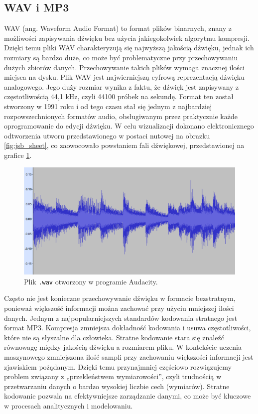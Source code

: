 \documentclass[data-science]{agh-wi} %
\begin{document}
\subsection{WAV i MP3}
WAV (ang. Waveform Audio Format) to format plików binarnych, znany z możliwości zapisywania dźwięku bez użycia jakiegokolwiek algorytmu kompresji. Dzięki temu pliki WAV charakteryzują się najwyższą jakością dźwięku, jednak ich rozmiary są bardzo duże, co może być problematyczne przy przechowywaniu dużych zbiorów danych. Przechowywanie takich plików wymaga znacznej ilości miejsca na dysku. Plik WAV jest najwierniejszą cyfrową reprezentacją dźwięku analogowego. Jego duży rozmiar wynika z faktu, że dźwięk jest zapisywany z częstotliwością 44,1 kHz, czyli 44100 próbek na sekundę. Format ten został stworzony w 1991 roku i od tego czasu stał się jednym z najbardziej rozpowszechnionych formatów audio, obsługiwanym przez praktycznie każde oprogramowanie do edycji dźwięku. W celu wizualizacji dokonano elektronicznego odtworzenia utworu przedstawionego w postaci nutowej na obrazku \ref*{fig:jsb_sheet}, co zaowocowało powstaniem fali dźwiękowej, przedstawionej na grafice \ref*{fig:jsb_wav}.

\begin{figure}
    \begin{center}
        \includegraphics[width=\linewidth]{./img/jsb_wav.png}
    \end{center}
    \caption{Plik \texttt{.wav} otworzony w programie Audacity.}\label{fig:jsb_wav}
\end{figure}

Często nie jest konieczne przechowywanie dźwięku w formacie bezstratnym, ponieważ większość informacji można zachować przy użyciu mniejszej ilości danych. Jednym z najpopularniejszych standardów kodowania stratnego jest format MP3. Kompresja zmniejsza dokładność kodowania i usuwa częstotliwości, które nie są słyszalne dla człowieka. Stratne kodowanie stara się znaleźć równowagę między jakością dźwięku a rozmiarem pliku. W kontekście uczenia maszynowego zmniejszona ilość sampli przy zachowaniu większości informacji jest zjawiskiem pożądanym. Dzięki temu przynajmniej częściowo rozwiązujemy problem związany z „przekleństwem wymiarowości”, czyli trudnością w przetwarzaniu danych o bardzo wysokiej liczbie cech (wymiarów). Stratne kodowanie pozwala na efektywniejsze zarządzanie danymi, co może być kluczowe w procesach analitycznych i modelowaniu.
\end{document}
